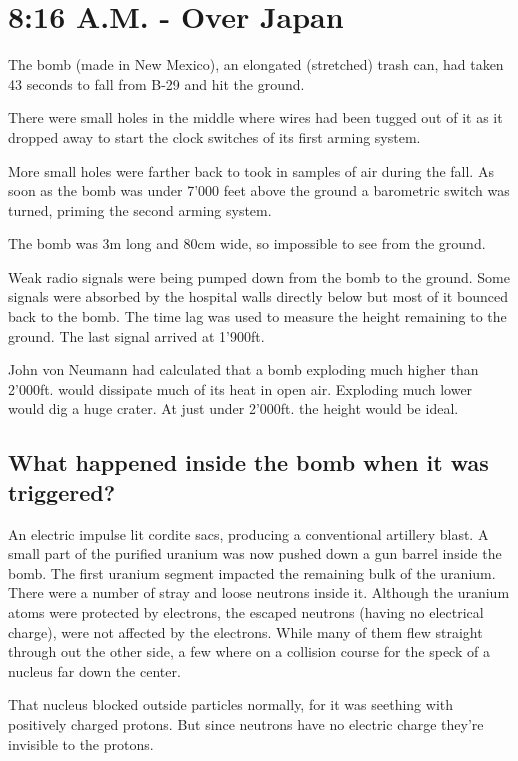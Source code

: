 %

\section{8:16 A.M. - Over Japan}

The bomb (made in New Mexico), an elongated (stretched) trash can, had taken 43 seconds to fall from B-29 and hit the ground.

There were small holes in the middle where wires had been tugged out of it as it dropped away to start the clock switches of its first arming system.

More small holes were farther back to took in samples of air during the fall. As soon as the bomb was under 7'000 feet above the ground a barometric switch was turned, priming the second arming system.

The bomb was 3m long and 80cm wide, so impossible to see from the ground.

Weak radio signals were being pumped down from the bomb to the ground. Some signals were absorbed by the hospital walls directly below but most of it bounced back to the bomb. The time lag was used to measure the height remaining to the ground. The last signal arrived at 1'900ft. 

John von Neumann had calculated that a bomb exploding much higher than 2'000ft. would dissipate much of its heat in open air. Exploding much lower would dig a huge crater. At just under 2'000ft. the height would be ideal.

\subsection*{What happened inside the bomb when it was triggered?}

An electric impulse lit cordite sacs, producing a conventional artillery blast. A small part of the purified uranium was now pushed down a gun barrel inside the bomb.
The first uranium segment impacted the remaining bulk of the uranium. There were a number of stray and loose neutrons inside it. Although the uranium atoms were protected by electrons, the escaped neutrons (having no electrical charge), were not affected by the electrons. While many of them flew straight through out the other side, a few where on a collision course for the speck of a nucleus far down the center. 

That nucleus blocked outside particles normally, for it was seething with positively charged protons. But since neutrons have no electric charge they're invisible to the protons. 

